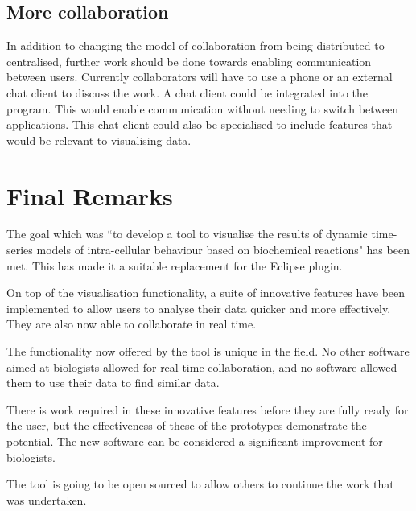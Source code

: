 \subsection{More collaboration}
In addition to changing the model of collaboration from being distributed to centralised, further work should be done towards enabling communication between users.  Currently collaborators will have to use a phone or an external chat client to discuss the work.  A chat client could be integrated into the program.  This would enable communication without needing to switch between applications.  This chat client could also be specialised to include features that would be relevant to visualising data.

\section{Final Remarks}

The goal which was ``to develop a tool to visualise the results of dynamic time-series models of intra-cellular behaviour based on biochemical reactions" has been met.  This has made it a suitable replacement for the Eclipse plugin.

On top of the visualisation functionality, a suite of innovative features have been implemented to allow users to analyse their data quicker and more effectively.  They are also now able to collaborate in real time.

The functionality now offered by the tool is unique in the field.  No other software aimed at biologists allowed for real time collaboration, and no software allowed them to use their data to find similar data.

There is work required in these innovative features before they are fully ready for the user, but the effectiveness of these of the prototypes demonstrate the potential.  The new software can be considered a significant improvement for biologists.

The tool is going to be open sourced to allow others to continue the work that was undertaken.
